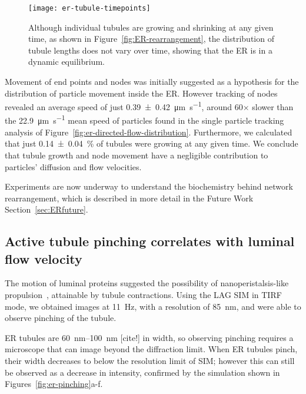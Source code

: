 \begin{figure}[htbp!]
\centering
\texttt{[image: er-tubule-timepoints]}
\caption[ER: Distribution of tubule length remains constant despite growing and shrinking of individual tubules]{Although individual tubules are growing and shrinking at any given time, as shown in Figure~\ref{fig:ER-rearrangement}, the distribution of tubule lengths does not vary over time, showing that the ER is in a dynamic equilibrium. } 
\label{fig:er-tubule-timepoints}
\end{figure}

Movement of end points and nodes was initially suggested as a hypothesis for the distribution of particle movement inside the ER. 
However tracking of nodes revealed an average speed of just \SI[separate-uncertainty=true]{0.39 \pm 0.42}{\micro\metre\per\second}, around 60$\times$ slower than the \SI{22.9}{\micro\metre\per\second} mean speed of particles found in the single particle tracking analysis of Figure~\ref{fig:er-directed-flow-distribution}. 
Furthermore, we calculated that just \SI[separate-uncertainty=true]{0.14 \pm 0.04}{\percent} of tubules were growing at any given time. 
We conclude that tubule growth and node movement have a negligible contribution to particles' diffusion and flow velocities. 

Experiments are now underway to understand the biochemistry behind network rearrangement, which is described in more detail in the Future Work Section~\ref{sec:ERfuture}. 

\subsection{Active tubule pinching correlates with luminal flow velocity}
The motion of luminal proteins suggested the possibility of nanoperistalsis-like propulsion~\cite{nadeem2014mathematical}, attainable by tubule contractions. 
Using the LAG SIM in TIRF mode, we obtained images at \SI{11}{\hertz}, with a resolution of \SI{85}{\nano\metre}, and were able to observe pinching of the tubule. 

ER tubules are \SIrange{60}{100}{\nano\metre} [cite!] in width, so observing pinching requires a microscope that can image beyond the diffraction limit. 
When ER tubules pinch, their width decreases to below the resolution limit of SIM; however this can still be observed as a decrease in intensity, confirmed by the simulation shown in Figures~\ref{fig:er-pinching}a-f. 

